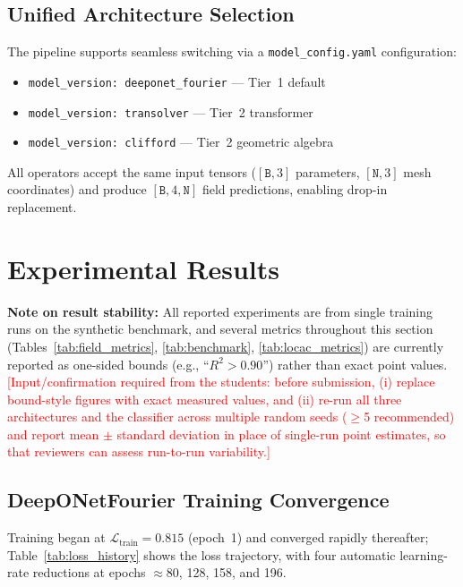 \documentclass[journal]{IEEEtran}
\begin{document}
\subsection{Unified Architecture Selection}

The pipeline supports seamless switching via a \texttt{model\_config.yaml} configuration:
\begin{itemize}
    \item \texttt{model\_version: deeponet\_fourier} --- Tier~1 default
    \item \texttt{model\_version: transolver} --- Tier~2 transformer
    \item \texttt{model\_version: clifford} --- Tier~2 geometric algebra
\end{itemize}
All operators accept the same input tensors ($[\texttt{B},3]$ parameters, $[\texttt{N},3]$ mesh coordinates) and produce $[\texttt{B},4,\texttt{N}]$ field predictions, enabling drop-in replacement.

\section{Experimental Results}
\label{sec:results}

\textbf{Note on result stability:} All reported experiments are from single training runs on the synthetic benchmark, and several metrics throughout this section (Tables~\ref{tab:field_metrics}, \ref{tab:benchmark}, \ref{tab:locac_metrics}) are currently reported as one-sided bounds (e.g., ``$R^2 > 0.90$'') rather than exact point values. \textcolor{red}{[Input/confirmation required from the students: before submission, (i) replace bound-style figures with exact measured values, and (ii) re-run all three architectures and the classifier across multiple random seeds ($\geq$5 recommended) and report mean $\pm$ standard deviation in place of single-run point estimates, so that reviewers can assess run-to-run variability.]}

\subsection{DeepONetFourier Training Convergence}

Training began at $\mathcal{L}_\text{train} = 0.815$ (epoch~1) and converged rapidly thereafter; Table~\ref{tab:loss_history} shows the loss trajectory, with four automatic learning-rate reductions at epochs $\approx$80, 128, 158, and 196.
\end{document}
